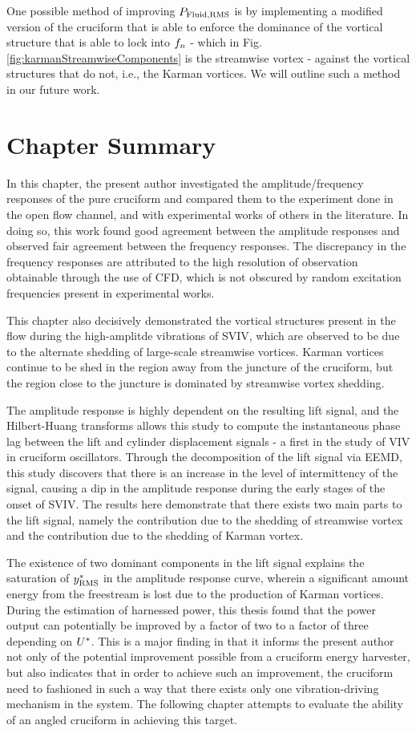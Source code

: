 \documentclass[oneside]{utmthesis}
\begin{document}
One possible method of improving $P_{\text{Fluid,RMS}}$ is by implementing a modified version of the cruciform that is able to enforce the dominance of the vortical structure that is able to lock into $f_{n}$ - which in Fig. \ref{fig:karmanStreamwiseComponents} is the streamwise vortex - against the vortical structures that do not, i.e., the Karman vortices. We will outline such a method in our future work.

\section{Chapter Summary} \label{sec:chapSumPure}
In this chapter, the present author investigated the amplitude/frequency responses of the pure cruciform and compared them to the experiment done in the open flow channel, and with experimental works of others in the literature. In doing so, this work found good agreement between the amplitude responses and observed fair agreement between the frequency responses. The discrepancy in the frequency responses are attributed to the high resolution of observation obtainable through the use of CFD, which is not obscured by random excitation frequencies present in experimental works.

This chapter also decisively demonstrated the vortical structures present in the flow during the high-amplitde vibrations of SVIV, which are observed to be due to the alternate shedding of large-scale streamwise vortices. Karman vortices continue to be shed in the region away from the juncture of the cruciform, but the region close to the juncture is dominated by streamwise vortex shedding.

The amplitude response is highly dependent on the resulting lift signal, and the Hilbert-Huang transforms allows this study to compute the instantaneous phase lag between the lift and cylinder displacement signals - a first in the study of VIV in cruciform oscillators. Through the decomposition of the lift signal via EEMD, this study discovers that there is an increase in the level of intermittency of the signal, causing a dip in the amplitude response during the early stages of the onset of SVIV. The results here demonstrate that there exists two main parts to the lift signal, namely the contribution due to the shedding of streamwise vortex and the contribution due to the shedding of Karman vortex.

The existence of two dominant components in the lift signal explains the saturation of $y^{*}_{\text{RMS}}$ in the amplitude response curve, wherein a significant amount energy from the freestream is lost due to the production of Karman vortices. During the estimation of harnessed power, this thesis found that the power output can potentially be improved by a factor of two to a factor of three depending on $U^{*}$. This is a major finding in that it informs the present author not only of the potential improvement possible from a cruciform energy harvester, but also indicates that in order to achieve such an improvement, the cruciform need to fashioned in such a way that there exists only one vibration-driving mechanism in the system. The following chapter attempts to evaluate the ability of an angled cruciform in achieving this target.
\end{document}
